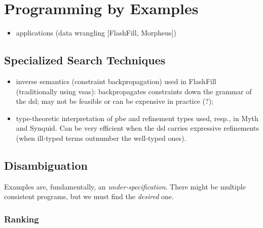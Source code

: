 \section{Programming by Examples}
\label{sec:pbe}

\begin{itemize}
\item applications (data wrangling [FlashFill, Morpheus])
\end{itemize}

\subsection{Specialized Search Techniques}
\label{sec:pbe-search-techniques}



\begin{itemize}
\item inverse semantics (constraint backpropagation) used in FlashFill
(traditionally using \glspl{vsa}): backpropagates constraints down the grammar of
the \gls{dsl}; may not be feasible or can be expensive in practice (?);
\item type-theoretic interpretation of \gls{pbe} and refinement types used, resp.,
in Myth and Synquid. Can be very efficient when the \gls{dsl} carries expressive
refinements (when ill-typed terms outnumber the well-typed ones).
\end{itemize}

\subsection{Disambiguation}
\label{sec:resolving-ambiguity}

Examples are, fundamentally, an \textit{under-specification}. There might be
multiple consistent programs, but we must find the \textit{desired} one.

\subsubsection{Ranking}

